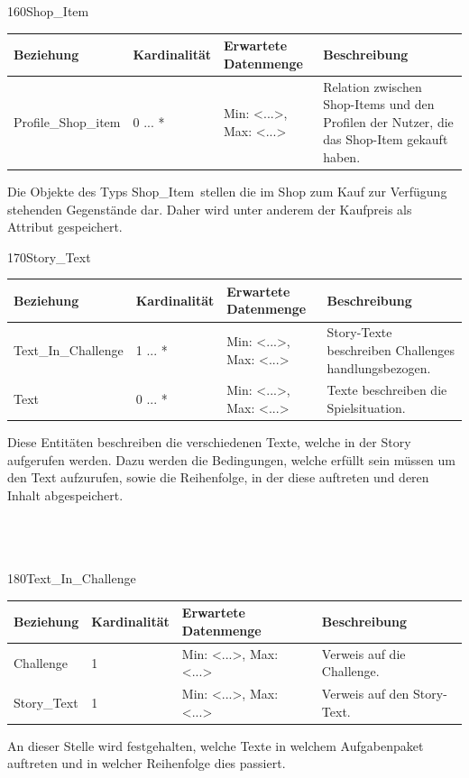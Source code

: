 \begin{entity}{160}{Shop\_Item}
\begin{center}
	\begin{longtable}{|m{4cm}|m{}|m{}|m{}|}
 	 \hline
 	 \textbf{Beziehung} & \textbf{Kardinalität} &  \textbf{Erwartete Datenmenge} & \textbf{Beschreibung} \\
  	\hline
  	Profile\_Shop\_item & 0 ... *  & Min: <...>, Max: <...> & Relation zwischen Shop-Items und den Profilen der Nutzer, die das Shop-Item gekauft haben.\\
	  \hline
	\end{longtable}
\end{center}
Die Objekte des Typs \glqq Shop\_Item\grqq~stellen die im Shop zum Kauf zur Verfügung stehenden Gegenstände dar. Daher wird unter anderem der Kaufpreis als Attribut gespeichert.
\end{entity}

\newpage
\begin{entity}{170}{Story\_Text}
\begin{center}
	\begin{longtable}{|m{4cm}|m{}|m{}|m{}|}
 	 \hline
 	 \textbf{Beziehung} & \textbf{Kardinalität} &  \textbf{Erwartete Datenmenge} & \textbf{Beschreibung} \\
  	\hline
  	Text\_In\_Challenge & 1 ... * & Min: <...>, Max: <...> & Story-Texte beschreiben Challenges handlungsbezogen.\\
  	\hline
  	Text & 0 ... * & Min: <...>, Max: <...> & Texte beschreiben die Spielsituation.\\
	  \hline
	\end{longtable}
\end{center}
Diese Entitäten beschreiben die verschiedenen Texte, welche in der Story aufgerufen werden. Dazu werden die Bedingungen, welche erfüllt sein müssen um den Text aufzurufen, sowie die Reihenfolge, in der diese auftreten und deren Inhalt abgespeichert. \\\\\\\
\end{entity}

\begin{entity}{180}{Text\_In\_Challenge}
\begin{center}
	\begin{longtable}{|m{4cm}|m{}|m{}|m{}|}
 	 \hline
 	 \textbf{Beziehung} & \textbf{Kardinalität} &  \textbf{Erwartete Datenmenge} & \textbf{Beschreibung} \\
  	\hline
  	Challenge & 1 & Min: <...>, Max: <...> & Verweis auf die Challenge.\\
	  \hline
	Story\_Text & 1 & Min: <...>, Max: <...> & Verweis auf den Story-Text.\\
	  \hline
	\end{longtable}
\end{center}
An dieser Stelle wird festgehalten, welche Texte in welchem Aufgabenpaket auftreten und in welcher Reihenfolge dies passiert.
\end{entity}

